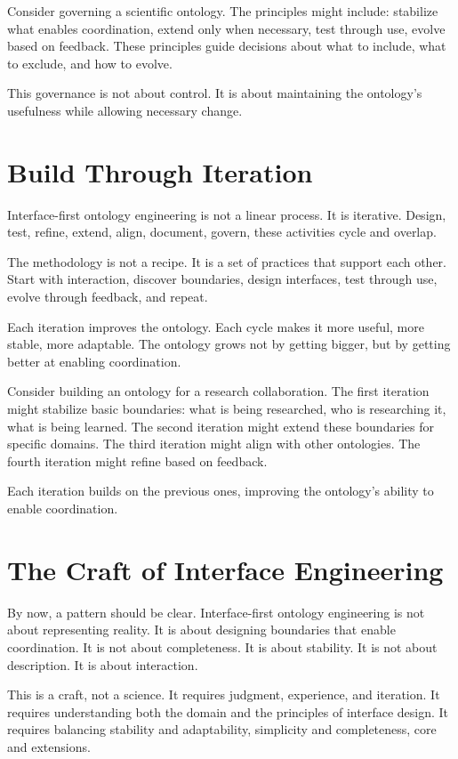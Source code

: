 \documentclass[
  openright]{book}
\begin{document}
Consider governing a scientific ontology. The principles might include:
stabilize what enables coordination, extend only when necessary, test
through use, evolve based on feedback. These principles guide decisions
about what to include, what to exclude, and how to evolve.

This governance is not about control. It is about maintaining the
ontology's usefulness while allowing necessary change.

\section{Build Through Iteration}\label{build-through-iteration}

Interface-first ontology engineering is not a linear process. It is
iterative. Design, test, refine, extend, align, document, govern, these
activities cycle and overlap.

The methodology is not a recipe. It is a set of practices that support
each other. Start with interaction, discover boundaries, design
interfaces, test through use, evolve through feedback, and repeat.

Each iteration improves the ontology. Each cycle makes it more useful,
more stable, more adaptable. The ontology grows not by getting bigger,
but by getting better at enabling coordination.

Consider building an ontology for a research collaboration. The first
iteration might stabilize basic boundaries: what is being researched,
who is researching it, what is being learned. The second iteration might
extend these boundaries for specific domains. The third iteration might
align with other ontologies. The fourth iteration might refine based on
feedback.

Each iteration builds on the previous ones, improving the ontology's
ability to enable coordination.

\section{The Craft of Interface
Engineering}\label{the-craft-of-interface-engineering}

By now, a pattern should be clear. Interface-first ontology engineering
is not about representing reality. It is about designing boundaries that
enable coordination. It is not about completeness. It is about
stability. It is not about description. It is about interaction.

This is a craft, not a science. It requires judgment, experience, and
iteration. It requires understanding both the domain and the principles
of interface design. It requires balancing stability and adaptability,
simplicity and completeness, core and extensions.
\end{document}
